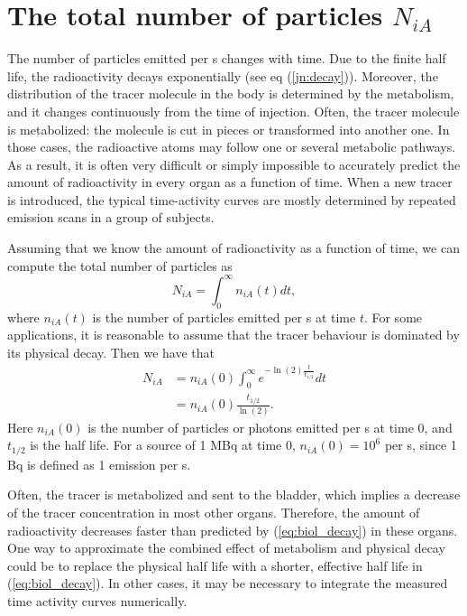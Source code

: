 \documentclass[11pt,oneside]{book}
\begin{document}
\section{The total number of particles $N_{iA}$}
The number of particles emitted per s changes with time. Due to the finite
half life, the radioactivity decays exponentially (see eq
(\ref{jn:decay})). Moreover, the distribution of the tracer molecule in the
body is determined by the metabolism, and it changes continuously from the
time of injection. Often, the tracer molecule is metabolized: the molecule is
cut in pieces or transformed into another one. In those cases, the radioactive
atoms may follow one or several metabolic pathways. As a result, it is often
very difficult or simply impossible to accurately predict the amount of
radioactivity in every organ as a function of time. When a new tracer is
introduced, the typical time-activity curves are mostly determined by repeated
emission scans in a group of subjects.

Assuming that we know the amount of radioactivity as a function of time, we
can compute the total number of particles as
\begin{equation}
  N_{iA} =  \int_0^{\infty} n_{iA}(t) dt,
\end{equation}
where $n_{iA}(t)$ is the number of particles emitted per s at time $t$.
For some applications, it is reasonable to assume that the tracer behaviour is
dominated by its physical decay. Then we have that
\begin{align}
  N_{iA} &= n_{iA}(0) \int_0^{\infty} e^{- \ln(2) \frac{t}{t_{1/2}}} dt \nonumber\\
         &= n_{iA}(0) \frac{t_{1/2}}{\ln(2)}. \label{eq:biol_decay}
\end{align}
Here $n_{iA}(0)$ is the number of particles or photons emitted per s at time
0, and $t_{1/2}$ is the half life.
For a source of 1 MBq at time 0, $n_{iA}(0) = 10^6$ per s, since 1 Bq is
defined as 1 emission per s.

Often, the tracer is metabolized and sent to the bladder, which implies a
decrease of the tracer concentration in most other organs. Therefore,
the amount of radioactivity decreases faster than predicted by
(\ref{eq:biol_decay}) in these organs. One way to approximate the combined
effect of metabolism and physical decay could be to replace the physical
half life with a shorter, effective half life in (\ref{eq:biol_decay}).
In other cases, it may
be necessary to integrate the measured time activity curves numerically.
\end{document}

